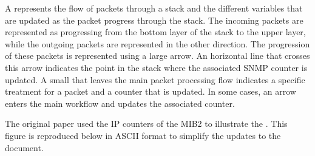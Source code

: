 \documentclass[letterpaper,10pt,english]{sphinxmanual}
\begin{document}
\sphinxAtStartPar
A  represents the flow of packets through a stack and the
different variables that are updated as the packet progress through the
stack. The incoming packets are represented as progressing from
the bottom layer of the stack to the upper layer, while the outgoing
packets are represented in the other direction. The progression of these
packets is represented using a large arrow. An horizontal line
that crosses this arrow indicates the point in the stack where the associated
SNMP counter is updated. A small that leaves the main packet processing
flow indicates a specific treatment for a packet and a counter
that is updated. In some cases, an arrow enters the main workflow and
updates the associated counter.

\sphinxAtStartPar
The original paper used the IP counters of the MIB\sphinxhyphen{}2 to illustrate the
. This figure is reproduced below in ASCII format to simplify
the updates to the document.
\end{document}
